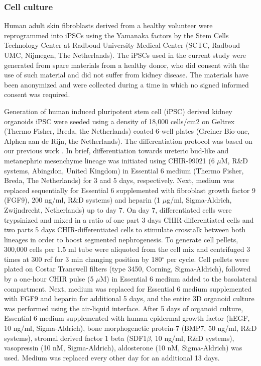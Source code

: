 \subsubsection{Cell culture}

Human adult skin fibroblasts derived from a healthy volunteer were reprogrammed into iPSCs using the Yamanaka factors \cite{takahashi2006induction} by the Stem Cells Technology Center at Radboud University Medical Center (SCTC, Radboud UMC, Nijmegen, The Netherlands). The iPSCs used in the current study were generated from spare materials from a healthy donor, who did consent with the use of such material and did not suffer from kidney disease. The materials have been anonymized and were collected during a time in which no signed informed consent was required.

Generation of human induced pluripotent stem cell (iPSC) derived kidney organoids iPSC were seeded using a density of 18,000 cells/cm2 on Geltrex (Thermo Fisher, Breda, the Netherlands) coated 6-well plates (Greiner Bio-one, Alphen aan de Rijn, the Netherlands). The differentiation protocol was based on our previous work \cite{jansen2022sars}. In brief, differentiation towards ureteric bud-like and metanephric mesenchyme lineage was initiated using CHIR-99021 (6 $\mu$M, R\&D systems, Abingdon, United Kingdom) in Essential 6 medium (Thermo Fisher, Breda, The Netherlands) for 3 and 5 days, respectively. Next, medium was  replaced sequentially for Essential 6 supplemented with fibroblast growth factor 9 (FGF9), 200 ng/ml, R\&D systems) and heparin (1 $\mu$g/ml, Sigma-Aldrich, Zwijndrecht, Netherlands) up to day 7. On day 7, differentiated cells were trypsinized and mixed in a ratio of one part 3 days CHIR-differentiated cells and two parts 5 days CHIR-differentiated cells to stimulate crosstalk between both lineages in order to boost segmented nephrogenesis. To generate cell pellets, 300,000 cells per 1.5 ml tube were aliquoted from the cell mix and centrifuged 3 times at 300 rcf for 3 min changing position by 180$^\circ$ per cycle. Cell pellets were plated on Costar Transwell filters (type 3450, Corning, Sigma-Aldrich), followed by a one-hour CHIR pulse (5 $\mu$M) in Essential 6 medium added to the basolateral compartment. Next, medium was replaced for Essential 6 medium supplemented with FGF9 and heparin for additional 5 days, and the entire 3D organoid culture was performed using the air-liquid interface. After 5 days of organoid culture, Essential 6 medium supplemented with human epidermal growth factor (hEGF, 10 ng/ml, Sigma-Aldrich), bone morphogenetic protein-7 (BMP7, 50 ng/ml, R\&D systems), stromal derived factor 1 beta (SDF1$\beta$, 10 ng/ml, R\&D systems), vasopressin (10 nM, Sigma-Aldrich), aldosterone (10 nM, Sigma-Aldrich) was used. Medium was replaced every other day for an additional 13 days. 

